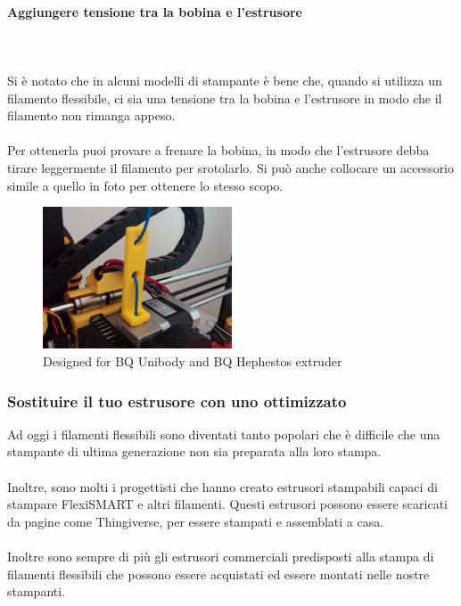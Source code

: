 \documentclass[11pt,a4paper]{article}
\begin{document}
			\paragraph{Aggiungere tensione tra la bobina e l'estrusore}\mbox{}\\\\
Si è notato che in alcuni modelli di stampante è bene che, quando si utilizza un filamento flessibile, ci sia una tensione tra la bobina e l'estrusore in modo che il filamento non rimanga appeso. 
\\\\
Per ottenerla puoi provare a frenare la bobina, in modo che l'estrusore debba tirare leggermente il filamento per srotolarlo. Si può anche collocare un accessorio simile a quello in foto per ottenere lo stesso scopo.
\begin{figure}[H]
\centering
\includegraphics[width=0.5\textwidth,cfbox=azul_marcos 4pt 0pt]{FOTOS/SOLUCION2}
\caption*{Designed for BQ Unibody and BQ Hephestos extruder}
\end{figure}
		\subsubsection{Sostituire il tuo estrusore con uno ottimizzato}
Ad oggi i filamenti flessibili sono diventati tanto popolari che è difficile che una stampante di ultima generazione non sia preparata alla loro stampa.
\\\\
Inoltre, sono molti i progettisti che hanno creato estrusori stampabili capaci di stampare FlexiSMART e altri filamenti. Questi estrusori possono essere scaricati da pagine come Thingiverse, per essere stampati e assemblati a casa. 
\\\\
Inoltre sono sempre di più gli estrusori commerciali predisposti alla stampa di filamenti flessibili che possono essere acquistati ed essere montati nelle nostre stampanti. 
\end{document}
